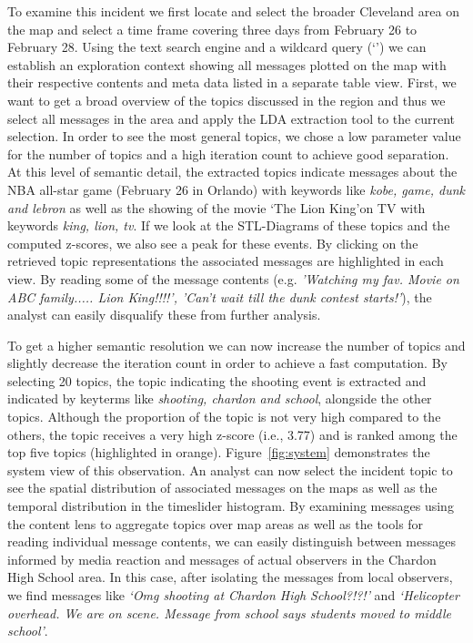 To examine this incident we first locate and select the broader Cleveland area on the map and select a time frame covering three days from February 26 to February 28. 
Using the text search engine and a wildcard query (\textquoteleft *\textquoteright) we can establish an exploration context showing all messages plotted on the map with their respective contents and meta data listed in a separate table view. First, we want to get a broad overview of the topics discussed in the region and thus we select all messages in the area and apply the LDA extraction tool to the current selection. In order to see the most general topics, we chose a low parameter value for the number of topics and a high iteration count to achieve good separation. At this level of semantic detail, the extracted topics indicate messages about the NBA all-star game (February 26 in Orlando) with keywords like \textit{kobe, game, dunk and lebron} as well as the showing of the movie \textquoteleft The Lion King\textquoteright on TV with keywords \textit{king, lion, tv}. If we look at the STL-Diagrams of these topics and the computed z-scores, we also see a peak for these events. By clicking on the retrieved topic representations the associated messages are highlighted in each view. By reading some of the message contents (e.g. \textit{'Watching my fav. Movie on ABC family..... Lion King!!!!', 'Can't wait till the dunk contest starts!'}), the analyst can easily disqualify these from further analysis.

To get a higher semantic resolution we can now increase the number of topics and slightly decrease the iteration count in order to achieve a fast computation. By selecting 20 topics, the topic indicating the shooting event is extracted and indicated by keyterms like \textit{shooting, chardon and school}, alongside the other topics. Although the proportion of the topic is not very high compared to the others, the topic receives a very high z-score (i.e., 3.77) and is ranked among the top five topics (highlighted in orange). Figure~\ref{fig:system} demonstrates the system view of this observation. An analyst can now select the incident topic to see the spatial distribution of associated messages on the maps as well as the temporal distribution in the timeslider histogram. By examining messages using the content lens to aggregate topics over map areas as well as the tools for reading individual message contents, we can easily distinguish between messages informed by media reaction and messages of actual observers in the Chardon High School area. In this case, after isolating the messages from local observers, we find messages like \textit{\textquoteleft Omg shooting at Chardon High School?!?!\textquoteright} and \textit{\textquoteleft Helicopter overhead. We are on scene. Message from school says students moved to middle school\textquoteright}.

